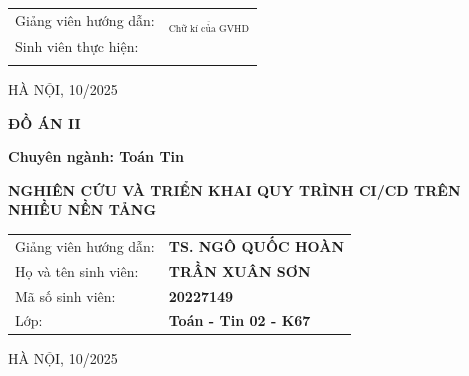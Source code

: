 \documentclass[14pt,oneside,A4paper,openright]{report}
\theoremstyle{plain}
\renewcommand{\large}{\fontsize{14pt}{14pt}\selectfont}
\renewcommand{\LARGE}{\fontsize{15pt}{15pt}\selectfont}
\begin{document}
\vspace{0.3cm}
\begin{center}
\begin{tabular}{l l}
\fontsize{13pt}{14pt} \selectfont
Giảng viên hướng dẫn:&\fontsize{13pt}{14pt}{\bf  TS. NGÔ QUỐC HOÀN}\quad $_{\overline{\text{Chữ kí của GVHD}}}$\\[0.5cm]

\fontsize{13pt}{14pt} \selectfont Sinh viên thực hiện:&\fontsize{13pt}{14pt}{\bf TRẦN XUÂN SƠN}\\[0.5cm]

\fontsize{13pt}{14pt} \selectfont {MSSV:}& \fontsize{13pt}{14pt}{\bf 20227149}\\
\end{tabular}

\end{center}
\vspace{2cm}
\begin{center}
\LARGE HÀ NỘI, 10/2025
\end{center}
\newpage
\begin{center}
\fontsize{17pt}{16pt}\selectfont
\textbf{ĐỒ ÁN II}\\
\end{center}
 \begin{center}
 \vspace{1cm}
\large \bf  Chuyên ngành: Toán Tin\\
\vspace{0.5cm}
\end{center}

\vspace{3cm}
\begin{center}
\fontsize{17pt}{16pt}\selectfont

\bf  NGHIÊN CỨU VÀ TRIỂN KHAI QUY TRÌNH CI/CD TRÊN NHIỀU NỀN TẢNG

\end{center}

\vspace{3cm}
\begin{center}
\begin{tabular}{l l}
Giảng viên hướng dẫn:&{\bf  TS. NGÔ QUỐC HOÀN}\\[0.5cm]
Họ và tên sinh viên:&{\bf TRẦN XUÂN SƠN}\\[0.5cm]
Mã số sinh viên:&{\bf 20227149}\\[0.5cm]
Lớp:&{\bf      Toán - Tin 02 - K67}
\end{tabular}

\end{center}
\vspace{4cm}
\begin{center}
\LARGE HÀ NỘI, 10/2025
\end{center}
\end{document}
